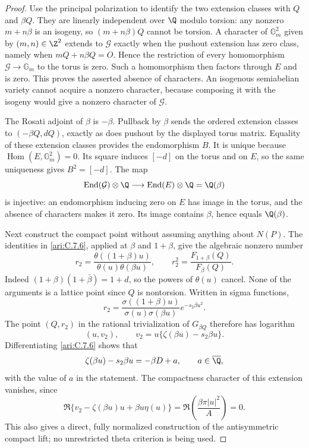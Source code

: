 \begin{proof}
Use the principal polarization to identify the two extension
classes with $Q$ and $\beta Q$. They are linearly independent
over $\Q$ modulo torsion: any nonzero $m+n\beta$ is an
isogeny, so $(m+n\beta)Q$ cannot be torsion. A character
of $\mathbb G_m^2$ given by $(m,n)\in\Z^2$ extends to
$\mathcal G$ exactly when the pushout extension has zero
class, namely when $mQ+n\beta Q=O$. Hence the restriction
of every homomorphism $\mathcal G\to\mathbb G_m$ to
the torus is zero. Such a homomorphism then factors through
$E$ and is zero. This proves the asserted absence of
characters. An isogenous semiabelian variety cannot acquire
a nonzero character, because composing it with the isogeny
would give a nonzero character of $\mathcal G$.

The Rosati adjoint of $\beta$ is $-\beta$. Pullback by
$\beta$ sends the ordered extension classes to
$(-\beta Q,dQ)$, exactly as does pushout by the displayed
torus matrix. Equality of these extension classes provides
the endomorphism $B$. It is unique because
$\operatorname{Hom}(E,\mathbb G_m^2)=0$. Its square
induces $[-d]$ on the torus and on $E$, so the same
uniqueness gives $B^2=[-d]$. The map
\[
 \operatorname{End}(\mathcal G)\otimes\Q
     \longrightarrow\operatorname{End}(E)\otimes\Q
          =\Q(\beta)
\]
is injective: an endomorphism inducing zero on $E$ has image
in the torus, and the absence of characters makes it zero.
Its image contains $\beta$, hence equals $\Q(\beta)$.

Next construct the compact point without assuming anything
about $N(P)$. The identities in \ref{ari:C.7.6}, applied at $\beta$
and $1+\beta$, give the algebraic nonzero number
\begin{equation}\label{ari:eq:ce-ribet-r}
 r_2=\frac{\theta((1+\beta)u)}{\theta(u)\theta(\beta u)},
 \qquad r_2^2=\frac{F_{1+\beta}(Q)}{F_\beta(Q)}.
\end{equation}
Indeed $(1+\beta)(1+\bar\beta)=1+d$, so the powers
of $\theta(u)$ cancel. None of the arguments is a lattice
point since $Q$ is nontorsion. Written in sigma functions,
\[
 r_2=\frac{\sigma((1+\beta)u)}{\sigma(u)\sigma(\beta u)}
                         e^{-s_2\beta u^2}.
\]
The point $(Q,r_2)$ in the rational trivialization of
$G_{\beta Q}$ therefore has logarithm
\[
 (u,v_2),\qquad
 v_2=u\{\zeta(\beta u)-s_2\beta u\}.
\]
Differentiating \ref{ari:C.7.6} shows that
\begin{equation}\label{ari:eq:ce-zeta}
 \zeta(\beta u)-s_2\beta u=-\beta D+a,
 \qquad a\in\overline\Q,
\end{equation}
with the value of $a$ in the statement. The compactness
character of this extension vanishes, since
\[
 \Re\{v_2-\zeta(\beta u)u+\beta u\eta(u)\}
    =\Re\left(\frac{\beta\pi|u|^2}{A}\right)=0.
\]
This also gives a direct, fully normalized construction of
the antisymmetric compact lift; no unrestricted theta
criterion is being used.


\end{proof}
